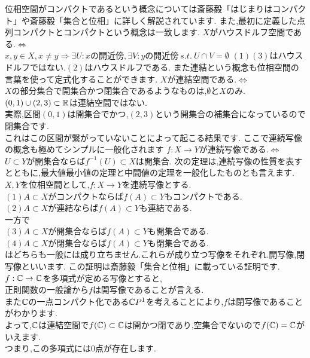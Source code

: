 位相空間がコンパクトであるという概念については斎藤毅「はじまりはコンパクト」や斎藤毅「集合と位相」に詳しく解説されています.
また,最初に定義した点列コンパクトとコンパクトという概念は一致します.
$X$がハウスドルフ空間である.$\iff$\\
$x,y \in X , x\neq y \Rightarrow \exists U:x\mbox{の開近傍} ,\exists V:y\mbox{の開近傍} \ s.t. \ U \cap V = \emptyset$
\ex
$(1)(3)$はハウスドルフではない.$(2)$はハウスドルフである.
\exx
また連結という概念も位相空間の言葉を使って定式化することができます.
$X$が連結空間である.$\iff$\\
$X$の部分集合で開集合かつ閉集合であるようなものは,$\emptyset$と$X$のみ.
\ex
$(0,1) \cup (2,3)\subset\mathbb R$は連結空間ではない.\\
実際,区間$(0,1)$は開集合でかつ,$(2,3)$という開集合の補集合になっているので閉集合です.\\
これはこの区間が繋がっていないことによって起こる結果です.
\exx
ここで連続写像の概念も極めてシンプルに一般化されます
$f:X\to Y$が連続写像である.$\iff$\\
$U \subset Y$が開集合ならば$f^{-1}(U) \subset X$は開集合.
次の定理は,連続写像の性質を表すとともに,最大値最小値の定理と中間値の定理を一般化したものとも言えます.
\thm
$X,Y$を位相空間として,$f:X\to Y$を連続写像とする.\\
$(1)$$A\subset X$がコンパクトならば$f(A)\subset Y$もコンパクトである.\\
$(2)$$A\subset X$が連結ならば$f(A)\subset Y$も連結である.\\
\thmx
\rem
一方で\\
$(3)A\subset X$が開集合ならば$f(A)\subset Y$も開集合である.\\
$(4)A\subset X$が閉集合ならば$f(A)\subset Y$も閉集合である.\\
はどちらも一般には成り立ちません.これらが成り立つ写像をそれぞれ.開写像,閉写像といいます.
\remx
\proof[位相空間論における代数学の基本定理の証明]
この証明は斎藤毅「集合と位相」に載っている証明です.\\
$f:\mathbb C \to \mathbb C$を多項式が定める写像とすると,\\
正則関数の一般論から$f$は開写像であることが言える.\\
また$\mathbb C$の一点コンパクト化である$\mathbb C P^1$を考えることにより,$f$は閉写像であることがわかります.\\
よって,$\mathbb C$は連結空間で$f(\mathbb C)\subset\mathbb C$は開かつ閉であり,空集合でないので$f(\mathbb C)=\mathbb C$がいえます.\\
つまり,この多項式には$0$点が存在します.
\proofx


